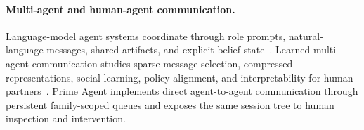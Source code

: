 \paragraph{Multi-agent and human-agent communication.}
Language-model agent systems coordinate through role prompts, natural-language messages, shared artifacts, and explicit belief state~\citep{wu2023autogen,li2023camel,hong2023metagpt,qian2023chatdev,li2023theoryofmind,sarafian2026workspaceoptimization}.
Learned multi-agent communication studies sparse message selection, compressed representations, social learning, policy alignment, and interpretability for human partners~\citep{karten2023losslesscommunication,karten2023sociallearning,karten2023interpretablecommunication,karten2023emergent}.
Prime Agent implements direct agent-to-agent communication through persistent family-scoped queues and exposes the same session tree to human inspection and intervention.
